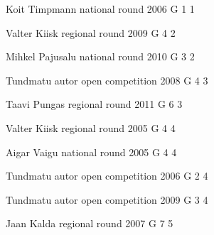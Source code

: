 \documentclass[11pt]{article}
\begin{document}
\ylDisplay{} %
{Koit Timpmann} %
{national round} %
{2006} %
{G 1} %
{1} %
{

\ifEngStatement
\fi
}

\ylDisplay{} %
{Valter Kiisk} %
{regional round} %
{2009} %
{G 4} %
{2} %
{

\ifEngStatement
\fi
}

\ylDisplay{} %
{Mihkel Pajusalu} %
{national round} %
{2010} %
{G 3} %
{2} %
{

\ifEngStatement
\fi
}

\ylDisplay{} %
{Tundmatu autor} %
{open competition} %
{2008} %
{G 4} %
{3} %
{

\ifEngStatement
\fi
}

\ylDisplay{} %
{Taavi Pungas} %
{regional round} %
{2011} %
{G 6} %
{3} %
{

\ifEngStatement
\fi
}

\ylDisplay{} %
{Valter Kiisk} %
{regional round} %
{2005} %
{G 4} %
{4} %
{

\ifEngStatement
\fi
}

\ylDisplay{} %
{Aigar Vaigu} %
{national round} %
{2005} %
{G 4} %
{4} %
{

\ifEngStatement
\fi
}

\ylDisplay{} %
{Tundmatu autor} %
{open competition} %
{2006} %
{G 2} %
{4} %
{

\ifEngStatement
\fi
}

\ylDisplay{} %
{Tundmatu autor} %
{open competition} %
{2009} %
{G 3} %
{4} %
{

\ifEngStatement
\fi
}

\ylDisplay{} %
{Jaan Kalda} %
{regional round} %
{2007} %
{G 7} %
{5} %
{

\ifEngStatement
\fi
}
\end{document}
